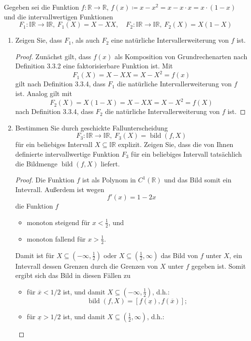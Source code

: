 \documentclass[12pt]{extreport} %
\newcommand{\R}{\mathbb{R}}
\begin{document}
Gegeben sei die Funktion $f \colon \R \rightarrow \R$, $f(x) \coloneqq x - x^2 = x - x \cdot x = x \cdot \left( 1 - x \right)$ und die intervallwertigen Funktionen
	$$ F_1 \colon \mathbb{IR} \rightarrow \mathbb{IR}, ~ F_1(X) = X - X X, \quad F_2 \colon \mathbb{IR} \rightarrow \mathbb{IR}, ~ F_2(X) = X(1- X) $$
\begin{enumerate}
	\item Zeigen Sie, dass $F_1$, als auch $F_2$ eine natürliche Intervallerweiterung von $f$ ist.
		\begin{proof} 
			Zunächst gilt, dass $f(x)$ als Komposition von Grundrechenarten nach Definition 3.3.2 eine faktorisierbare Funktion ist. Mit 
			$$ F_1(X) = X-XX = X-X^2 = f(x) $$
			gilt nach Definition 3.3.4, dass $F_1$ die natürliche Intervallerweiterung von $f$ ist. Analog gilt mit 
			$$ F_2(X)=X(1-X)=X-XX=X-X^2=f(X) $$
			nach Definition 3.3.4, dass $F_2$ die natürliche Intervallerweiterung von $f$ ist.
		\end{proof}
	\item Bestimmen Sie durch geschickte Fallunterscheidung
		$$ F_3 \colon \mathbb{IR} \rightarrow \mathbb{IR}, ~ F_3(X) = \operatorname{bild}(f, X) $$
		für ein beliebiges Intervall $X \subseteq \mathbb{IR}$ explizit. Zeigen Sie, dass die von Ihnen definierte intervallwertige Funktion $F_3$ für ein beliebiges Intervall tatsächlich die Bildmenge $\operatorname{bild}(f, X)$ liefert.
		\begin{proof}
			Die Funktion $f$ ist als Polynom in $C^1(\R)$ und das Bild somit ein  Intevrall. Außerdem ist wegen 
				$$ f'(x) = 1 - 2x $$ 
			die Funktion $f$ 
			\begin{itemize}
				\item monoton steigend für $x < \frac{1}{2}$, und
				\item monoton fallend für $x > \frac{1}{2}$.
			\end{itemize}
			Damit ist für $X \subseteq \left(-\infty, \frac{1}{2} \right)$ oder $X \subseteq \left(\frac{1}{2}, \infty \right)$ das Bild von $f$ unter $X$,  ein Intevrall dessen Grenzen durch die Grenzen von $X$ unter $f$ gegeben ist. Somit ergibt sich das Bild in diesen Fällen zu
			\begin{itemize}
				\item für $\overline{x} < 1/2$ ist, und damit $X \subseteq \left(-\infty, \frac{1}{2} \right)$, d.h.:
					$$ \operatorname{bild}(f,X) = \left[f(\underline{x}), f(\overline{x}) \right]; $$
				\item für $\underline{x} >1/2$ ist, und damit $X \subseteq \left(\frac{1}{2}, \infty \right)$, d.h.:

\end{itemize}
\end{proof}
\end{enumerate}
\end{document}
